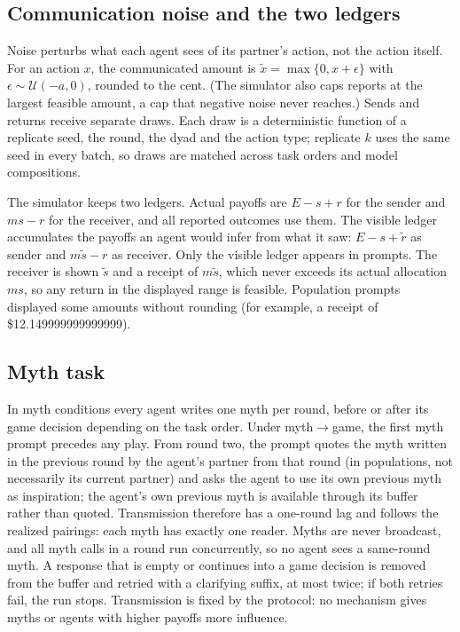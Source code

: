 \subsection{Communication noise and the two ledgers}
\label{sec:protocol-noise}

Noise perturbs what each agent sees of its partner's action, not the action itself. For an action $x$, the communicated amount is $\widetilde{x}=\max\{0,x+\epsilon\}$ with $\epsilon\sim\mathcal{U}(-a,0)$, rounded to the cent. (The simulator also caps reports at the largest feasible amount, a cap that negative noise never reaches.) Sends and returns receive separate draws. Each draw is a deterministic function of a replicate seed, the round, the dyad and the action type; replicate $k$ uses the same seed in every batch, so draws are matched across task orders and model compositions.

The simulator keeps two ledgers. Actual payoffs are $E-s+r$ for the sender and $ms-r$ for the receiver, and all reported outcomes use them. The visible ledger accumulates the payoffs an agent would infer from what it saw: $E-s+\widetilde{r}$ as sender and $m\widetilde{s}-r$ as receiver. Only the visible ledger appears in prompts. The receiver is shown $\widetilde{s}$ and a receipt of $m\widetilde{s}$, which never exceeds its actual allocation $ms$, so any return in the displayed range is feasible. Population prompts displayed some amounts without rounding (for example, a receipt of \$12.149999999999999).

\subsection{Myth task}
\label{sec:protocol-myths}

In myth conditions every agent writes one myth per round, before or after its game decision depending on the task order. Under myth$\rightarrow$game, the first myth prompt precedes any play. From round two, the prompt quotes the myth written in the previous round by the agent's partner from that round (in populations, not necessarily its current partner) and asks the agent to use its own previous myth as inspiration; the agent's own previous myth is available through its buffer rather than quoted. Transmission therefore has a one-round lag and follows the realized pairings: each myth has exactly one reader. Myths are never broadcast, and all myth calls in a round run concurrently, so no agent sees a same-round myth. A response that is empty or continues into a game decision is removed from the buffer and retried with a clarifying suffix, at most twice; if both retries fail, the run stops. Transmission is fixed by the protocol: no mechanism gives myths or agents with higher payoffs more influence.


